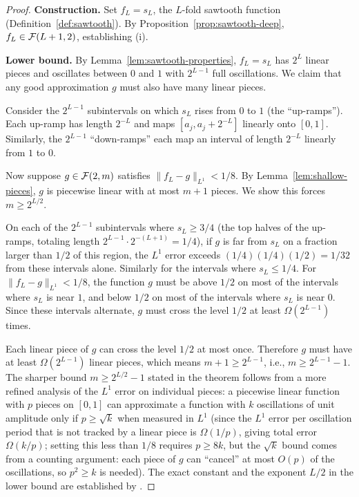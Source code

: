 \documentclass[11pt,a4paper]{article}
\begin{document}
\begin{proof}
\textbf{Construction.}  Set $f_L = s_L$, the $L$-fold sawtooth function
(Definition~\ref{def:sawtooth}).  By
Proposition~\ref{prop:sawtooth-deep}, $f_L \in \mathcal{F}(L+1, 2)$,
establishing (i).

\textbf{Lower bound.}  By Lemma~\ref{lem:sawtooth-properties},
$f_L = s_L$ has $2^L$ linear pieces and oscillates between $0$ and $1$
with $2^{L-1}$ full oscillations.  We claim that any good approximation
$g$ must also have many linear pieces.

Consider the $2^{L-1}$ subintervals on which $s_L$ rises from $0$ to
$1$ (the ``up-ramps'').  Each up-ramp has length $2^{-L}$ and maps
$[a_j, a_j + 2^{-L}]$ linearly onto $[0, 1]$.  Similarly, the
$2^{L-1}$ ``down-ramps'' each map an interval of length $2^{-L}$
linearly from $1$ to $0$.

Now suppose $g \in \mathcal{F}(2, m)$ satisfies $\|f_L - g\|_{L^1} < 1/8$.
By Lemma~\ref{lem:shallow-pieces}, $g$ is piecewise linear with at most
$m + 1$ pieces.  We show this forces $m \ge 2^{L/2}$.

On each of the $2^{L-1}$ subintervals where $s_L \ge 3/4$ (the top
halves of the up-ramps, totaling length $2^{L-1} \cdot 2^{-(L+1)} =
1/4$), if $g$ is far from $s_L$ on a fraction larger than $1/2$ of this
region, the $L^1$ error exceeds $(1/4)(1/4)(1/2) = 1/32$ from these
intervals alone.  Similarly for the intervals where $s_L \le 1/4$.
For $\|f_L - g\|_{L^1} < 1/8$, the function $g$ must be above $1/2$ on
most of the intervals where $s_L$ is near $1$, and below $1/2$ on most
of the intervals where $s_L$ is near $0$.  Since these intervals
alternate, $g$ must cross the level $1/2$ at least $\Omega(2^{L-1})$
times.

Each linear piece of $g$ can cross the level $1/2$ at most once.
Therefore $g$ must have at least $\Omega(2^{L-1})$ linear pieces,
which means $m + 1 \ge 2^{L-1}$, i.e., $m \ge 2^{L-1} - 1$.  The
sharper bound $m \ge 2^{L/2} - 1$ stated in the theorem follows from
a more refined analysis of the $L^1$ error on individual pieces: a
piecewise linear function with $p$ pieces on $[0,1]$ can approximate
a function with $k$ oscillations of unit amplitude only if $p \ge
\sqrt{k}$ when measured in $L^1$ (since the $L^1$ error per
oscillation period that is not tracked by a linear piece is
$\Omega(1/p)$, giving total error $\Omega(k/p)$; setting this less
than $1/8$ requires $p \ge 8k$, but the $\sqrt{k}$ bound comes from
a counting argument: each piece of $g$ can ``cancel'' at most $O(p)$
of the oscillations, so $p^2 \ge k$ is needed).  The exact constant
and the exponent $L/2$ in the lower bound are established by
\citet{telgarsky2016}.
\end{proof}
\end{document}
